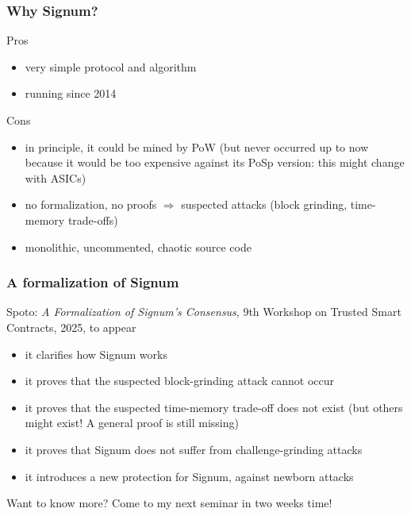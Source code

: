 \documentclass[11pt]{beamer}  %
\begin{document}
\begin{frame}\frametitle{Why Signum?}

  \begin{greenbox}{Pros}
    \begin{itemize}
    \item very simple protocol and algorithm
    \item running since 2014
    \end{itemize}
  \end{greenbox}

  \bigskip

  \begin{greenbox}{Cons}
    \begin{itemize}
    \item in principle, it could be mined by PoW (but never occurred up to now because it would be too expensive
      against its PoSp version: this might change with ASICs)
    \item no formalization, no proofs $\Rightarrow$ suspected attacks (block grinding, time-memory trade-offs)
    \item monolithic, uncommented, chaotic source code
    \end{itemize}
  \end{greenbox}
    
\end{frame}

\begin{frame}\frametitle{A formalization of Signum}

  \begin{greenbox}{}
    Spoto: \emph{A Formalization of Signum's Consensus},
    9th Workshop on Trusted Smart Contracts, 2025, to appear
  \end{greenbox}

  \bigskip

  \begin{itemize}
  \item it clarifies how Signum works
  \item it proves that the suspected block-grinding attack cannot occur
  \item it proves that the suspected time-memory trade-off does not exist (but others might exist! A general proof is still missing)
  \item it proves that Signum does not suffer from challenge-grinding attacks
  \item it introduces a new protection for Signum, against newborn attacks
  \end{itemize}

  \bigskip

  \begin{greenbox}{Want to know more?}
    Come to my next seminar in two weeks time!
  \end{greenbox}

\end{frame}
\end{document}
